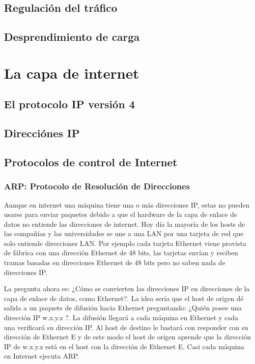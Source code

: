 \documentclass[10pt,a4paper]{report}
\begin{document}
\subsection{Regulación del tráfico}
\subsection{Desprendimiento de carga}

\section{La capa de internet}
	\subsection{El protocolo IP versión 4}
	\subsection{Direcciónes IP}


\subsection{Protocolos de control de Internet}

\subsubsection{ARP: Protocolo de Resolución de Direcciones}

	\par Aunque en internet una máquina tiene una o más direcciones IP, estas no pueden usarse para enviar paquetes debido a que el hardware de la capa de enlace de datos no entiende las direcciones de internet. Hoy día la mayoría de los hosts de las compañías y las universidades se une a una LAN por una tarjeta de red que solo entiende direcciones LAN. Por ejemplo cada tarjeta Ethernet viene provista de fábrica con una dirección Ethernet de 48 bits, las tarjetas envían y reciben tramas basadas en direcciones Ethernet de 48 bits pero no saben nada de direcciones IP.
	
	\par La pregunta ahora es: ¿Cómo se convierten las direcciones IP en direcciones de la capa de enlace de datos, como Ethernet?. La idea sería que el host de origen dé salida a un paquete de difusión hacia Ethernet preguntando: ¿Quién posee una dirección IP w.x.y.z ?. La difusión llegará a cada máquina en Ethernet y cada una verificará su dirección IP. Al host de destino le bastará con responder con su dirección de Ethernet E y de este modo el host de origen aprende que la dirección IP de w.x.y.z está en el host con la dirección de Ethernet E. Casi cada máquina en Internet ejecuta ARP.
\end{document}
